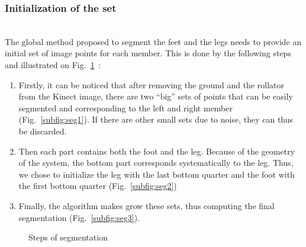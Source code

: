 \documentclass[letterpaper, 10 pt, conference]{ieeeconf}
\begin{document}
\subsubsection{Initialization of the set}~\\
The global method proposed to segment the feet and the legs needs to provide an initial set of image points for each member. This is done by the following steps and illustrated on Fig.~\ref{fig:segmentation}~:
\begin{enumerate}
	\item Firstly, it can be noticed that after removing the ground and the rollator from the Kinect image, there are two ``big'' sets of points that can be easily segmented and corresponding to the left and right member (Fig.~\ref{subfig:seg1}). If there are other small sets due to noise, they can thus be discarded.
	\item Then each part contains both the foot and the leg. Because of the geometry of the system, the bottom part corresponds systematically to the leg. Thus, we chose to initialize the leg with the last bottom quarter and the foot with the first bottom quarter (Fig.~\ref{subfig:seg2})
	\item Finally, the algorithm makes grow these sets, thus computing the final segmentation (Fig.~\ref{subfig:seg3}).
\end{enumerate}
\begin{figure}
	\centering
	\hfill
	 \hfill
	\caption{Steps of segmentation}
	\label{fig:segmentation}
\end{figure}
\end{document}
